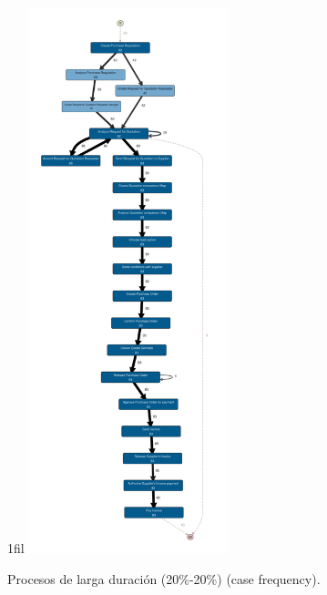 \documentclass[13pt,a4paper]{article}
\makeatletter
\newcommand*{\centerfloat}{%
  \parindent \z@
  \leftskip \z@ \@plus 1fil \@minus \textwidth
  \rightskip\leftskip
  \parfillskip \z@skip}
\makeatother
\begin{document}
\newpage

\begin{figure}[t]
  \centerfloat
  \includegraphics[width=0.515\textwidth]{img/longDuration_20_20.pdf}
  \caption{Procesos de larga duración (20\%-20\%)  (case frequency).}
\end{figure}


    \setlength{\parskip}{1em}
    \newpage
\end{document}
